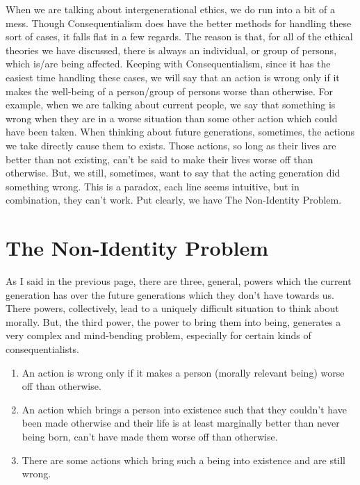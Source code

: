 
When we are talking about intergenerational ethics, we do run into a bit of a mess. Though Consequentialism does have the better methods for handling these sort of cases, it falls flat in a few regards. The reason is that, for all of the ethical theories we have discussed, there is always an individual, or group of persons, which is/are being affected. Keeping with Consequentialism, since it has the easiest time handling these cases, we will say that an action is wrong only if it makes the well-being of a person/group of persons worse than otherwise. For example, when we are talking about current people, we say that something is wrong when they are in a worse situation than some other action which could have been taken. When thinking about future generations, sometimes, the actions we take directly cause them to exists. Those actions, so long as their lives are better than not existing, can't be said to make their lives worse off than otherwise. But, we still, sometimes, want to say that the acting generation did something wrong. This is a paradox, each line seems intuitive, but in combination, they can't work. Put clearly, we have The Non-Identity Problem.
\section{The Non-Identity Problem}
As I said in the previous page, there are three, general, powers which the current generation has over the future generations which they don't have towards us. There powers, collectively, lead to a uniquely difficult situation to think about morally. But, the third power, the power to bring them into being, generates a very complex and mind-bending problem, especially for certain kinds of consequentialists. 

\begin{enumerate}
    \item An action is wrong only if it makes a person (morally relevant being) worse off than otherwise.
    \item An action which brings a person into existence such that they couldn’t have been made otherwise and their life is at least marginally better than never being born, can’t have made them worse off than otherwise.
    \item There are some actions which bring such a being into existence and are still wrong.
\end{enumerate}

